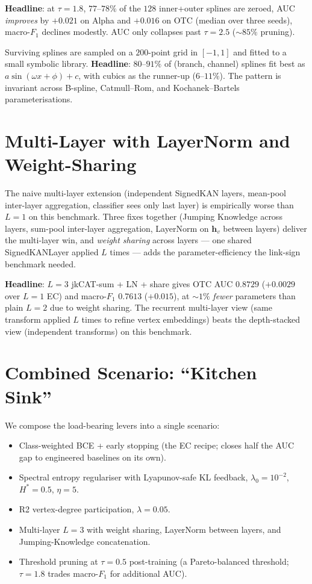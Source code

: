 \documentclass[11pt, a4paper]{article}
\begin{document}
\textbf{Headline}: at $\tau\!=\!1.8$, $77$--$78\%$ of the $128$
inner+outer splines are zeroed, AUC \emph{improves} by $+0.021$ on
Alpha and $+0.016$ on OTC (median over three seeds), macro-$F_1$
declines modestly. AUC only collapses past $\tau\!=\!2.5$
($\sim\!85\%$ pruning).

Surviving splines are sampled on a $200$-point grid in $[-1, 1]$
and fitted to a small symbolic library. \textbf{Headline}:
$80$--$91\%$ of (branch, channel) splines fit best as
$a \sin(\omega x + \phi) + c$, with cubics as the runner-up
($6$--$11\%$). The pattern is invariant across B-spline,
Catmull--Rom, and Kochanek--Bartels parameterisations.

\section{Multi-Layer with LayerNorm and Weight-Sharing}

The naive multi-layer extension (independent SignedKAN layers,
mean-pool inter-layer aggregation, classifier sees only last layer)
is empirically worse than $L\!=\!1$ on this benchmark. Three fixes
together (Jumping Knowledge across layers, sum-pool inter-layer
aggregation, LayerNorm on $\mathbf{h}_v$ between layers) deliver
the multi-layer win, and \emph{weight sharing} across layers --- one
shared SignedKANLayer applied $L$ times --- adds the
parameter-efficiency the link-sign benchmark needed.

\textbf{Headline}: $L\!=\!3$ jkCAT-sum + LN + share gives OTC AUC
$0.8729$ ($+0.0029$ over $L\!=\!1$ EC) and macro-$F_1$ $0.7613$
($+0.015$), at $\sim\!1\%$ \emph{fewer} parameters than plain
$L\!=\!2$ due to weight sharing. The recurrent multi-layer view
(same transform applied $L$ times to refine vertex embeddings)
beats the depth-stacked view (independent transforms) on this
benchmark.

\section{Combined Scenario: ``Kitchen Sink''}

We compose the load-bearing levers into a single scenario:
\begin{itemize}
\item Class-weighted BCE + early stopping (the EC recipe;
  closes half the AUC gap to engineered baselines on its own).
\item Spectral entropy regulariser with Lyapunov-safe KL feedback,
  $\lambda_0\!=\!10^{-2}$, $H^*\!=\!0.5$, $\eta\!=\!5$.
\item R2 vertex-degree participation, $\lambda\!=\!0.05$.
\item Multi-layer $L\!=\!3$ with weight sharing, LayerNorm between
  layers, and Jumping-Knowledge concatenation.
\item Threshold pruning at $\tau\!=\!0.5$ post-training (a
  Pareto-balanced threshold; $\tau\!=\!1.8$ trades macro-$F_1$
  for additional AUC).
\end{itemize}
\end{document}
